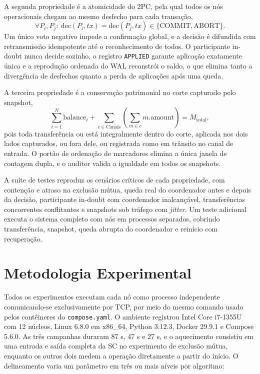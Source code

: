 \documentclass[conference]{IEEEtran}
\begin{document}
A segunda propriedade é a atomicidade do 2PC, pela qual todos os nós
operacionais chegam ao mesmo desfecho para cada transação,
\begin{equation}
    \forall P_i, P_j:\ \text{dec}(P_i, tx) = \text{dec}(P_j, tx) \in \{\text{COMMIT}, \text{ABORT}\}.
    \label{eq:atomicidade}
\end{equation}
Um único voto negativo impede a confirmação global, e a decisão é difundida
com retransmissão idempotente até o reconhecimento de todos. O participante
in-doubt nunca decide sozinho, o registro \texttt{APPLIED} garante aplicação
exatamente única e a reprodução ordenada do WAL reconstrói o saldo, o que
elimina tanto a divergência de desfechos quanto a perda de aplicações após
uma queda.

A terceira propriedade é a conservação patrimonial no corte capturado pelo
snapshot,
\begin{equation}
    \sum_{i=1}^{N} \text{balance}_i + \sum_{c \in \text{Canais}} \left( \sum_{m \in c} m.\text{amount} \right) = M_{\text{total}},
    \label{eq:conservacao}
\end{equation}
pois toda transferência ou está integralmente dentro do corte, aplicada nos
dois lados capturados, ou fora dele, ou registrada como em trânsito no canal
de entrada. O portão de ordenação de marcadores elimina a única janela de
contagem dupla, e o auditor valida a igualdade em todos os snapshots.

A suíte de testes reproduz os cenários críticos de cada propriedade, com
contenção e atraso na exclusão mútua, queda real do coordenador antes e
depois da decisão, participante in-doubt com coordenador inalcançável,
transferências concorrentes conflitantes e snapshots sob tráfego com
\emph{jitter}. Um teste adicional executa o sistema completo com nós em
processos separados, cobrindo transferência, snapshot, queda abrupta do
coordenador e reinício com recuperação.

\section{Metodologia Experimental}
Todos os experimentos executam cada nó como processo independente
comunicando-se exclusivamente por TCP, por meio do mesmo comando usado pelos
contêineres do \texttt{compose.yaml}. O ambiente registrou Intel Core
i7-1355U com 12 núcleos, Linux 6.8.0 em x86\_64, Python 3.12.3, Docker 29.9.1
e Compose 5.6.0. As três campanhas duraram 87 s, 47 s e 27 s, e o aquecimento
consistiu em uma entrada e saída completa da SC no experimento de exclusão
mútua, enquanto os outros dois medem a operação diretamente a partir do
início. O delineamento varia um parâmetro em três ou mais níveis por
algoritmo:
\end{document}
